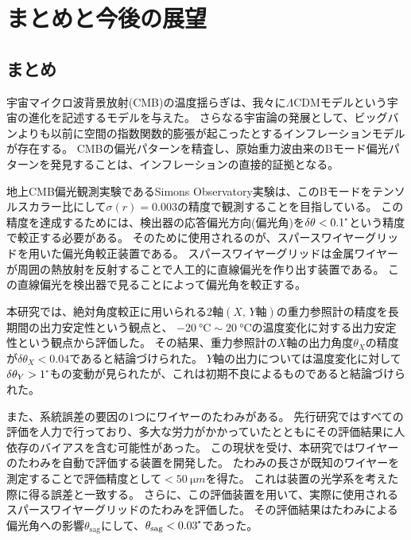 \documentclass[../../main.tex]{subfiles}
\begin{document}
\chapter{まとめと今後の展望}
\section{まとめ}
宇宙マイクロ波背景放射(CMB)の温度揺らぎは、我々に$\Lambda \mathrm{CDM}$モデルという宇宙の進化を記述するモデルを与えた。
さらなる宇宙論の発展として、ビッグバンよりも以前に空間の指数関数的膨張が起こったとするインフレーションモデルが存在する。
CMBの偏光パターンを精査し、原始重力波由来のBモード偏光パターンを発見することは、インフレーションの直接的証拠となる。

地上CMB偏光観測実験であるSimons Observatory実験は、このBモードをテンソルスカラー比にして$\sigma(r)=0.003$の精度で観測することを目指している。
この精度を達成するためには、検出器の応答偏光方向(偏光角)を$\delta\theta<0.1\tcdegree$という精度で較正する必要がある。
そのために使用されるのが、スパースワイヤーグリッドを用いた偏光角較正装置である。
スパースワイヤーグリッドは金属ワイヤーが周囲の熱放射を反射することで人工的に直線偏光を作り出す装置である。
この直線偏光を検出器で見ることによって偏光角を較正する。

本研究では、絶対角度較正に用いられる2軸$(X,\,Y\text{軸})$の重力参照計の精度を長期間の出力安定性という観点と、
$\SI{-20}{\degreeCelsius}\sim\SI{20}{\degreeCelsius}$の温度変化に対する出力安定性という観点から評価した。
その結果、重力参照計の$X$軸の出力角度$\theta_{X}$の精度が$\delta\theta_{X}<0.04$であると結論づけられた。
$Y$軸の出力については温度変化に対して$\delta\theta_{Y}>1\tcdegree$もの変動が見られたが、これは初期不良によるものであると結論づけられた。

また、系統誤差の要因の1つにワイヤーのたわみがある。
先行研究ではすべての評価を人力で行っており、多大な労力がかかっていたとともにその評価結果に人依存のバイアスを含む可能性があった。
この現状を受け、本研究ではワイヤーのたわみを自動で評価する装置を開発した。
たわみの長さが既知のワイヤーを測定することで評価精度として$<\SI{50}{\micro m}$を得た。
これは装置の光学系を考えた際に得る誤差と一致する。
さらに、この評価装置を用いて、実際に使用されるスパースワイヤーグリッドのたわみを評価した。
その評価結果はたわみによる偏光角への影響$\theta_{\mathrm{sag}}$にして、$\theta_{\mathrm{sag}}<0.03\tcdegree$であった。
\end{document}
